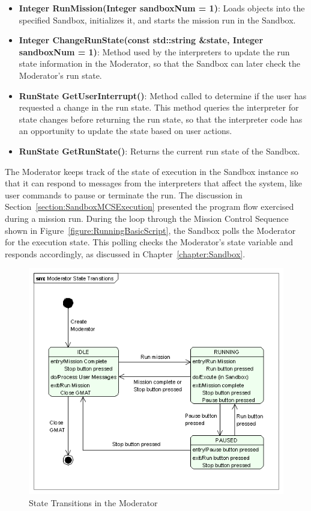 \begin{itemize}
\item \textbf{Integer RunMission(Integer sandboxNum = 1)}:  Loads objects into the specified
Sandbox, initializes it, and starts the mission run in the Sandbox.
\item \textbf{Integer ChangeRunState(const std::string \&state, Integer sandboxNum = 1)}: 
Method used by the interpreters to update the run state information in the Moderator, so that the
Sandbox can later check the Moderator's run state.
\item \textbf{RunState GetUserInterrupt()}:  Method called to determine if the user has requested a
change in the run state.  This method queries the interpreter for state changes before returning
the run state, so that the interpreter code has an opportunity to update the state based on user
actions.
\item \textbf{RunState GetRunState()}:  Returns the current run state of the Sandbox.
\end{itemize}

The Moderator keeps track of the state of execution in the Sandbox instance so that it can respond
to messages from the interpreters that affect the system, like user commands to pause or terminate
the run.  The discussion in Section~\ref{section:SandboxMCSExecution} presented the program flow
exercised during a mission run.  During the loop through the Mission Control Sequence shown in
Figure~\ref{figure:RunningBasicScript}, the Sandbox polls the Moderator for the execution state.
This polling checks the Moderator's state variable and responds accordingly, as discussed in
Chapter~\ref{chapter:Sandbox}.

\begin{figure}[htb]
\begin{center}
\includegraphics[260,231]{Images/ModeratorStateTransitions.png}
\caption{State Transitions in the Moderator}
\label{figure:ModeratorStateTransitions}
\end{center}
\end{figure}

